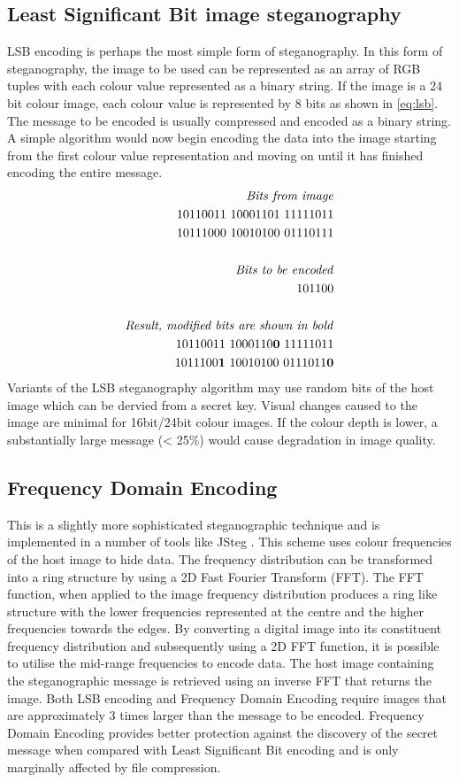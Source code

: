 \subsection {Least Significant Bit image steganography}  LSB encoding is perhaps the most simple form of steganography. In this form of steganography, the image to be used can be represented as an array of RGB tuples with each colour value represented as a binary string. If the image is a 24 bit colour image, each colour value is represented by 8 bits as shown in \ref{eq:lsb}. The message to be encoded is usually compressed and encoded as a binary string. A simple algorithm would now begin encoding the data into the image starting from the first colour value representation and moving on until it has finished encoding the entire message. 
\begin{equation}
\label{eq:lsb}
\begin{split}
\text{\emph{Bits from image}}
\\
10110011\ 10001101\ 11111011 \\
10111000\ 10010100\ 01110111 \\
\\
\text{\emph{Bits to be encoded}}
\\
101100\\
\\
\text{\emph{Result, modified bits are shown in bold}}
\\
10110011\ 1000110\mathbf{0}\ 11111011 \\
1011100\mathbf{1}\ 10010100\ 0111011\mathbf{0} \\
\end{split}
\end{equation}
Variants of the LSB steganography algorithm may use random bits of the host image which can be dervied from a secret key. Visual changes caused to the image are minimal for 16bit/24bit colour images. If the colour depth is lower, a substantially large message (< 25\%) would cause degradation in image quality. 
\subsection{Frequency Domain Encoding} This is a slightly more sophisticated steganographic technique and is implemented in a number of tools like JSteg \cite{jsteg}. This scheme uses colour frequencies of the host image to hide data. The frequency distribution can be transformed into a ring structure by using a 2D Fast Fourier Transform (FFT). The FFT function, when applied to the image frequency distribution produces a ring like structure with the lower frequencies represented at the centre and the higher frequencies towards the edges. By converting a digital image into its constituent frequency distribution and subsequently using a 2D FFT function, it is possible to utilise the mid-range frequencies to encode data. The host image containing the steganographic message is retrieved using an inverse FFT that returns the image. Both LSB encoding and Frequency Domain Encoding require images that are approximately 3 times larger than the message to be encoded. Frequency Domain Encoding provides better protection against the discovery of the secret message when compared with Least Significant Bit encoding and is only marginally affected by file compression. 
